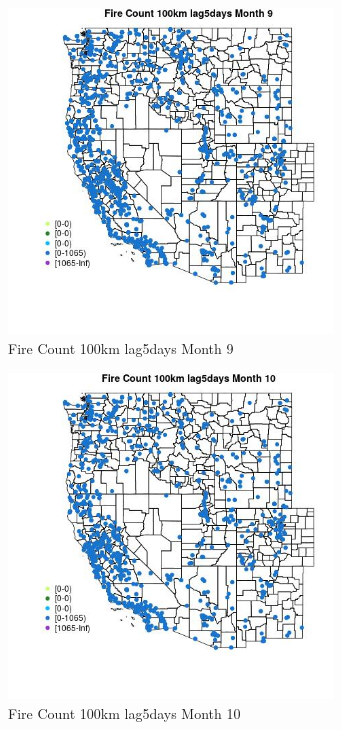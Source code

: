 \begin{figure} 
\centering  
\includegraphics[width=0.77\textwidth]{Code_Outputs/Report_ML_input_PM25_Step4_part_f_de_duplicated_aveswNAs_MapObsMo9Fire_Count_100km_lag5days.jpg} 
\caption{\label{fig:Report_ML_input_PM25_Step4_part_f_de_duplicated_aveswNAsMapObsMo9Fire_Count_100km_lag5days}Fire Count 100km lag5days Month 9} 
\end{figure} 
 

\begin{figure} 
\centering  
\includegraphics[width=0.77\textwidth]{Code_Outputs/Report_ML_input_PM25_Step4_part_f_de_duplicated_aveswNAs_MapObsMo10Fire_Count_100km_lag5days.jpg} 
\caption{\label{fig:Report_ML_input_PM25_Step4_part_f_de_duplicated_aveswNAsMapObsMo10Fire_Count_100km_lag5days}Fire Count 100km lag5days Month 10} 
\end{figure} 
 

